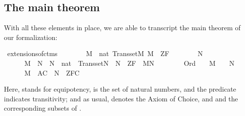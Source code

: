 \subsection{The main theorem}
With all these elements in place, we are able to transcript the main
theorem of our formalization:
\begin{isabelle}
\isamarkupfalse%
\ extensions{\isacharunderscore}of{\isacharunderscore}ctms{\isacharcolon}\isanewline
\ \ \ \isanewline
\ \ \ \ {\isachardoublequoteopen}M\ {\isasymapprox}\ nat{\isachardoublequoteclose}\ {\isachardoublequoteopen}Transset{\isacharparenleft}M{\isacharparenright}{\isachardoublequoteclose}\ {\isachardoublequoteopen}M\ {\isasymTurnstile}\ ZF{\isachardoublequoteclose}\isanewline
\ \ \ \isanewline
\ \ \ \ {\isachardoublequoteopen}{\isasymexists}N{\isachardot}\ \isanewline
\ \ \ \ \ \ M\ {\isasymsubseteq}\ N\ {\isasymand}\ N\ {\isasymapprox}\ nat\ {\isasymand}\ Transset{\isacharparenleft}N{\isacharparenright}\ {\isasymand}\ N\ {\isasymTurnstile}\ ZF\ {\isasymand}\ M{\isasymnoteq}N\ {\isasymand}\isanewline
\ \ \ \ \ \ {\isacharparenleft}{\isasymforall}{\isasymalpha}{\isachardot}\ Ord{\isacharparenleft}{\isasymalpha}{\isacharparenright}\ {\isasymlongrightarrow}\ {\isacharparenleft}{\isasymalpha}\ {\isasymin}\ M\ {\isasymlongleftrightarrow}\ {\isasymalpha}\ {\isasymin}\ N{\isacharparenright}{\isacharparenright}\ {\isasymand}\isanewline
\ \ \ \ \ \ {\isacharparenleft}M{\isacharcomma}\ {\isacharbrackleft}{\isacharbrackright}{\isasymTurnstile}\ AC\ {\isasymlongrightarrow}\ N\ {\isasymTurnstile}\ ZFC{\isacharparenright}{\isachardoublequoteclose}
\end{isabelle}
Here, \isatt{\isasymapprox} stands for equipotency,  is the
set of natural numbers, and the predicate 
 indicates transitivity; and as usual, 
denotes the Axiom of Choice, and  and  the
corresponding subsets of .

